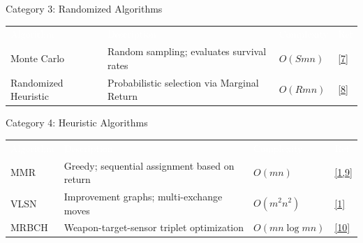 \documentclass[aspectratio=169,10pt]{beamer}
\begin{document}
\begin{frame}{Category 3: Randomized Algorithms}


  \vspace{0.4cm}
  \begin{center}
  \small
  \begin{tabular}{lp{4.5cm}lp{1cm}}
    \rowcolor{DarkSlate}
    \textcolor{white}{Algorithm} & \textcolor{white}{Description} & \textcolor{white}{Complexity} & \textcolor{white}{Ref} \\
    Monte Carlo & Random sampling; evaluates survival rates & $O(Smn)$ & \hyperlink{ref7}{[7]} \\
    Randomized Heuristic & Probabilistic selection via Marginal Return & $O(Rmn)$ & \hyperlink{ref8}{[8]} \\
  \end{tabular}
  \end{center}
\end{frame}

\begin{frame}{Category 4: Heuristic Algorithms}


  \vspace{0.4cm}
  \begin{center}
  \small
  \begin{tabular}{lp{4.5cm}lp{1cm}}
    \rowcolor{DarkSlate}
    \textcolor{white}{Algorithm} & \textcolor{white}{Description} & \textcolor{white}{Complexity} & \textcolor{white}{Ref} \\
    MMR & Greedy; sequential assignment based on return & $O(mn)$ & \hyperlink{ref1}{[1,9]} \\
    VLSN & Improvement graphs; multi-exchange moves & $O(m^2n^2)$ & \hyperlink{ref1}{[1]} \\
    MRBCH & Weapon-target-sensor triplet optimization & $O(mn\log mn)$ & \hyperlink{ref10}{[10]} \\
  \end{tabular}
  \end{center}
\end{frame}
\end{document}
